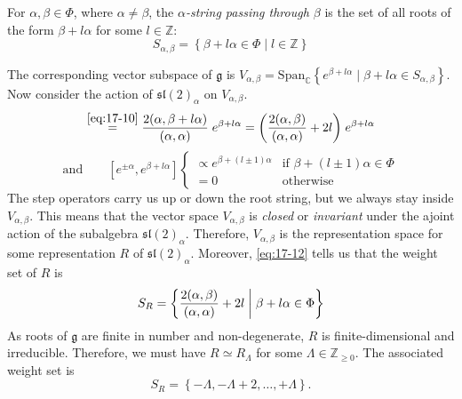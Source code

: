 \begin{definition}[]
  For $\alpha, \beta \in \Phi$, where $\alpha \neq \beta$, the \emph{$\alpha$-string passing through $\beta$} is the set of all roots of the form $\beta + l {\alpha}$ for some $l \in \mathbb{Z}$:
  \begin{equation}
    S_{\alpha, \beta} = \left\{ \beta + l \alpha \in \Phi \mid l \in \mathbb{Z} \right\}
  \end{equation}
\end{definition}
The corresponding vector subspace of $\mathfrak{g}$ is $ V_{\alpha, \beta} = \text{Span}_{\mathbb{C}}\left\{ e^{\beta + l \alpha} \mid \beta + l \alpha \in S_{\alpha, \beta}\right\}.$
Now consider the action of $\mathfrak{sl}(2)_{\alpha}$ on $V_{\alpha, \beta}$.
\begin{equation}
  [h^{\alpha}, e^{\beta + l \alpha}] \stackrel{\eqref{eq:17-10}}{=} \frac{2 (\alpha, \beta + l \alpha)}{(\alpha, \alpha)} \; e^{\beta + l \alpha} 
  = \qty( \frac{2 (\alpha, \beta)}{(\alpha, \alpha)} + 2 l) \; e^{\beta + l \alpha} \label{eq:17-12}
\end{equation}
\begin{equation}
  \text{and} \qquad [e^{\pm \alpha}, e^{\beta + l \alpha}] 
  \begin{cases}
    \propto e^{\beta + (l  \pm 1)\alpha} & \text{if } \beta + (l \pm 1) \alpha \in \Phi \\
    = 0 &  \text{otherwise}
  \end{cases}
\end{equation}
The step operators carry us up or down the root string, but we always stay inside $V_{\alpha, \beta}$.
This means that the vector space $V_{\alpha, \beta}$ is \emph{closed} or \emph{invariant} under the ajoint action of the subalgebra $\mathfrak{sl}(2)_{\alpha}$.
Therefore, $V_{\alpha, \beta}$ is the representation space for some representation $R$ of $\mathfrak{sl}(2)_{\alpha}$. 
Moreover, \eqref{eq:17-12} tells us that the weight set of $R$ is
\begin{equation}
  \label{eq:17-13}
  S_R = \left\{ \frac{2 (\alpha, \beta)}{(\alpha ,\alpha)} + 2 l \suchthat \beta + l \alpha \in \Phi \right\}
\end{equation}
As roots of $\mathfrak{g}$ are finite in number and non-degenerate, $R$ is finite-dimensional and irreducible. 
Therefore, we must have $R \simeq R_{\Lambda}$ for some $\Lambda \in \mathbb{Z}_{\geq 0}$.
The associated weight set is 
\begin{equation}
  \label{eq:17-14}
  S_R = \left\{ -\Lambda, -\Lambda + 2, \dots, +\Lambda \right\}.
\end{equation}

